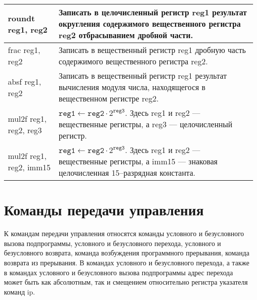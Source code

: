 \documentclass[10pt]{report}
\begin{document}
\begin{longtable}[c]{|l|p{12.5cm}|}
roundt reg1, reg2                & Записать в целочисленный регистр reg1 результат округления содержимого вещественного регистра reg2 отбрасыванием дробной части.    \\ \hline
frac reg1, reg2                  & Записать в вещественный регистр reg1 дробную часть содержимого вещественного регистра reg2.    \\ \hline
absf reg1, reg2                  & Записать в вещественный регистр reg1 результат вычисления модуля числа, находящегося в вещественном регистре reg2. \\ \hline
mul2f reg1, reg2, reg3           & $\texttt{reg1}\leftarrow \texttt{reg2}\cdot2^{\texttt{reg3}}$. Здесь reg1 и reg2 --- вещественные регистры, а reg3 --- целочисленный регистр. \\ \hline 
mul2f reg1, reg2, imm15           & $\texttt{reg1}\leftarrow \texttt{reg2}\cdot2^{\texttt{reg3}}$. Здесь reg1 и reg2 --- вещественные регистры, а imm15 --- знаковая целочисленная 15--разрядная константа. \\ \hline 
\end{longtable}    

    \section{Команды передачи управления}
К командам передачи управления относятся команды условного и безусловного вызова подпрограммы, условного и безусловного перехода, условного и безусловного возврата, команда возбуждения программного прерывания, команда возврата из прерывания. В командах условного и безусловного перехода, а также в командах условного и безусловного вызова подпрограммы адрес перехода может быть как абсолютным, так и смещением относительно регистра указателя команд ip.
\end{document}
